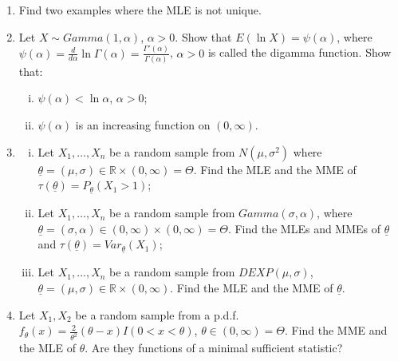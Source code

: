 \documentclass[11pt]{article}
\begin{document}
\begin{enumerate}
    \item Find two examples where the MLE is not unique.

    \item Let $X \sim Gamma(1, \alpha)$, $\alpha > 0$. Show that $E(\ln X) = \psi(\alpha)$, where $\psi(\alpha) = \frac{d}{d\alpha} \ln \Gamma(\alpha) = \frac{\Gamma'(\alpha)}{\Gamma(\alpha)}$, $\alpha > 0$ is called the digamma function. Show that:
    \begin{enumerate}[(i)]
        \item $\psi(\alpha) < \ln \alpha$, $\alpha > 0$;
        \item $\psi(\alpha)$ is an increasing function on $(0, \infty)$.
    \end{enumerate}

    \item 
    \begin{enumerate}[(i)]
        \item Let $X_{1}, \dots, X_{n}$ be a random sample from $N(\mu, \sigma^{2})$ where $\underline{\theta} = (\mu, \sigma) \in \mathbb{R} \times (0, \infty) = \Theta$. Find the MLE and the MME of $\tau(\underline{\theta}) = P_{\underline{\theta}}(X_{1} > 1)$;
        \item Let $X_{1}, \dots, X_{n}$ be a random sample from $Gamma(\sigma, \alpha)$, where $\underline{\theta} = (\sigma, \alpha) \in (0, \infty) \times (0, \infty) = \Theta$. Find the MLEs and MMEs of $\underline{\theta}$ and $\tau(\underline{\theta}) = Var_{\underline{\theta}}(X_{1})$;
        \item Let $X_{1}, \dots, X_{n}$ be a random sample from $DEXP(\mu, \sigma)$, $\underline{\theta} = (\mu, \sigma) \in \mathbb{R} \times (0, \infty)$. Find the MLE and the MME of $\underline{\theta}$.
    \end{enumerate}

    \item Let $X_{1}, X_{2}$ be a random sample from a p.d.f. $f_{\theta}(x) = \frac{2}{\theta^{2}}(\theta - x) I(0 < x < \theta)$, $\theta \in (0, \infty) = \Theta$. Find the MME and the MLE of $\theta$. Are they functions of a minimal sufficient statistic?


\end{enumerate}
\end{document}
